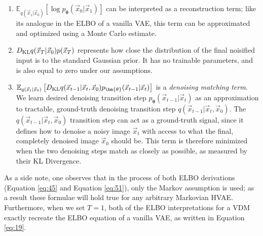 \begin{enumerate}
    \item $\mathbb{E}_{q(\vec{x}_{1}|\vec{x}_0)}\left[\log p_{\bm{\theta}}(\vec{x}_0|\vec{x}_1)\right]$ can be interpreted as a reconstruction term; like its analogue in the ELBO of a vanilla VAE, this term can be approximated and optimized using a Monte Carlo estimate.
    \item $D_{\rm{KL}}{q(\vec{x}_T|\vec{x}_0)}{p(\vec{x}_T)}$ represents how close the distribution of the final noisified input is to the standard Gaussian prior.  It has no trainable parameters, and is also equal to zero under our assumptions.
    \item $\mathbb{E}_{q(\vec{x}_{t}|\vec{x}_0)}\left[D_{\rm{KL}}{q(\vec{x}_{t-1}|\vec{x}_t, \vec{x}_0)}{p_{\bm{\theta}}(\vec{x}_{t-1}|\vec{x}_t)}\right]$ is a \textit{denoising matching term}.  We learn desired denoising transition step $p_{\bm{\theta}}(\vec{x}_{t-1}|\vec{x}_t)$ as an approximation to tractable, ground-truth denoising transition step $q(\vec{x}_{t-1}|\vec{x}_{t}, \vec{x}_0)$.  The $q(\vec{x}_{t-1}|\vec{x}_{t}, \vec{x}_0)$ transition step can act as a ground-truth signal, since it defines how to denoise a noisy image $\vec{x}_t$ with access to what the final, completely denoised image $\vec{x}_0$ should be.  This term is therefore minimized when the two denoising steps match as closely as possible, as measured by their KL Divergence.
\end{enumerate}
As a side note, one observes that in the process of both ELBO derivations (Equation \ref{eq:45} and Equation \ref{eq:51}), only the Markov assumption is used; as a result these formulae will hold true for any arbitrary Markovian HVAE.  Furthermore, when we set $T=1$, both of the ELBO interpretations for a VDM exactly recreate the ELBO equation of a vanilla VAE, as written in Equation \ref{eq:19}.

